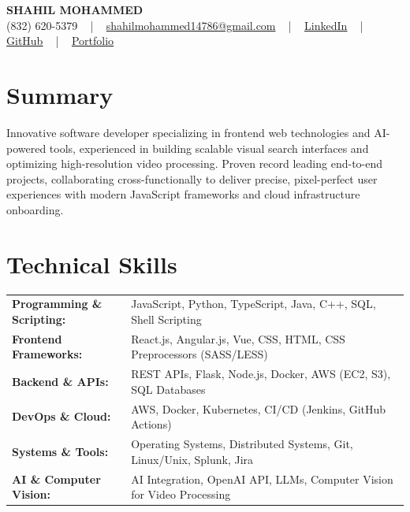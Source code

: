 \documentclass[letterpaper,11pt]{article}
\begin{document}
\begin{center}
    {\fontsize{14pt}{12pt}\selectfont \textbf{\MakeUppercase{Shahil Mohammed}}}\\ \vspace{2pt}
    \fontsize{10pt}{12pt}\selectfont (832) 620-5379 ~ | ~ \href{mailto:shahilmohammed14786@gmail.com}{shahilmohammed14786@gmail.com} ~ | ~  
    \href{https://www.linkedin.com/in/shahil-mohammed-9652931a1/}{\color{blue}\underline{LinkedIn}}  ~ | ~ 
    \href{https://github.com/freakbeast14}{\color{blue}\underline{GitHub}} ~ | ~ 
    \href{https://shahil-mohammed.netlify.app/}{\color{blue}\underline{Portfolio}}
    \vspace{-8pt}
\end{center}

\section{Summary}
\fontsize{9pt}{10pt}\selectfont
Innovative software developer specializing in frontend web technologies and AI-powered tools, experienced in building scalable visual search interfaces and optimizing high-resolution video processing. Proven record leading end-to-end projects, collaborating cross-functionally to deliver precise, pixel-perfect user experiences with modern JavaScript frameworks and cloud infrastructure onboarding.
 \vspace{-5pt}
 
\section{Technical Skills}
        \vspace{-14pt}
        \begin{table}[h]
            \fontsize{9pt}{10pt}\selectfont
            \begin{tabular}{p{0.3\linewidth} p{0.7\linewidth}}
                \textbf{Programming \& Scripting:} & JavaScript, Python, TypeScript, Java, C++, SQL, Shell Scripting \\
                \textbf{Frontend Frameworks:} & React.js, Angular.js, Vue, CSS, HTML, CSS Preprocessors (SASS/LESS) \\
                \textbf{Backend \& APIs:} & REST APIs, Flask, Node.js, Docker, AWS (EC2, S3), SQL Databases \\
                \textbf{DevOps \& Cloud:} & AWS, Docker, Kubernetes, CI/CD (Jenkins, GitHub Actions) \\
                \textbf{Systems \& Tools:} & Operating Systems, Distributed Systems, Git, Linux/Unix, Splunk, Jira \\
                \textbf{AI \& Computer Vision:} & AI Integration, OpenAI API, LLMs, Computer Vision for Video Processing \\
            \end{tabular}
        \end{table}
 \vspace{-15pt}
 
\end{document}

